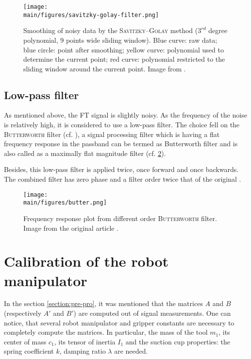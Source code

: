 \documentclass[/home/francois/latex/report/main.tex]{subfiles}
\begin{document}
\begin{figure}[H]
  \centering
  \texttt{[image: \\main/figures/savitzky-golay-filter.png]}
  \caption{Smoothing of noisy data by the \textsc{Savitzky–Golay} method ($3^{rd}$ degree polynomial, 9 points wide sliding window). Blue curve: raw data; blue circle: point after smoothing; yellow curve: polynomial used to determine the current point; red curve: polynomial restricted to the sliding window around the current point. Image from \cite{Cdang2013}.}
  \label{fig:method:savit}
\end{figure}

\subsection{Low-pass filter}

As mentioned above, the \ac{FT} signal is slightly noisy. As the frequency of the noise is relatively high, it is considered to use a low-pass filter. The choice fell on the \textsc{Butterworth} filter (cf. \cite{filter1923}), a signal processing filter which is having a flat frequency response in the passband can be termed as Butterworth filter and is also called as a maximally flat magnitude filter (cf. \ref{fig:method:butter}).

Besides, this low-pass filter is applied twice, once forward and once backwards. The combined filter has zero phase and a filter order twice that of the original \cite{SciPy2019}.

\begin{figure}[H]
  \centering
  \texttt{[image: \\main/figures/butter.png]}
  \caption{Frequency response plot from different order \textsc{Butterworth} filter. Image from the original article  \cite{filter1923}.}
  \label{fig:method:butter}
\end{figure}

\section{Calibration of the robot manipulator}

In the section \ref{section:pre-pro}, it was mentioned that the matrices $A$ and $B$ (respectively $A'$ and $B'$) are computed out of signal measurements. One can notice, that several robot manipulator and gripper constants are necessary to completely compute the matrices. In particular, the mass of the tool $m_1$, its center of mass $c_1$, its tensor of inertia $I_1$ and the suction cup properties: the spring coefficient $k$, damping ratio $\lambda$ are needed.
\end{document}
